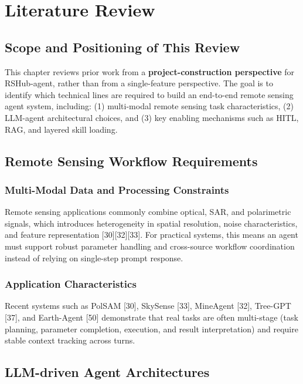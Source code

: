 \chapter{Literature Review}

{\fontsize{12pt}{14pt}\selectfont
	
	\section{Scope and Positioning of This Review}
	This chapter reviews prior work from a \textbf{project-construction perspective} for RSHub-agent, rather than from a single-feature perspective. The goal is to identify which technical lines are required to build an end-to-end remote sensing agent system, including: (1) multi-modal remote sensing task characteristics, (2) LLM-agent architectural choices, and (3) key enabling mechanisms such as HITL, RAG, and layered skill loading.

	\section{Remote Sensing Workflow Requirements}
	
	\subsection{Multi-Modal Data and Processing Constraints}
	Remote sensing applications commonly combine optical, SAR, and polarimetric signals, which introduces heterogeneity in spatial resolution, noise characteristics, and feature representation [30][32][33]. For practical systems, this means an agent must support robust parameter handling and cross-source workflow coordination instead of relying on single-step prompt response.
	
	\subsection{Application Characteristics}
	Recent systems such as PolSAM [30], SkySense [33], MineAgent [32], Tree-GPT [37], and Earth-Agent [50] demonstrate that real tasks are often multi-stage (task planning, parameter completion, execution, and result interpretation) and require stable context tracking across turns.

	\section{LLM-driven Agent Architectures}
	
}

